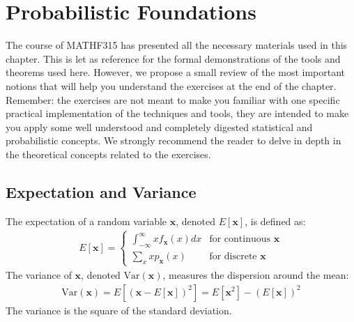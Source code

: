 \documentclass[letterpaper,10pt,english]{jupyterBook}
\begin{document}
\section{Probabilistic Foundations}
\label{\detokenize{01:probabilistic-foundations}}
\sphinxAtStartPar
The course of MATH\sphinxhyphen{}F315 \sphinxhyphen{}  has presented all the necessary materials used in this chapter. This is let as reference for the formal demonstrations of the tools and theorems used here. However, we propose a small review of the most important notions that will help you understand the exercises at the end of the chapter. Remember: the exercises are not meant to make you familiar with one specific practical implementation of the techniques and tools, they are intended to make you apply some well understood and completely digested statistical and probabilistic concepts. We strongly recommend the reader to delve in depth in the theoretical concepts related to the exercises.


\subsection{Expectation and Variance}
\label{\detokenize{01:expectation-and-variance}}
\sphinxAtStartPar
The expectation of a random variable \(\mathbf x\), denoted \(E[\mathbf x]\), is defined as:
\begin{equation*}
\begin{split}
E[\mathbf x] = \begin{cases}
    \int_{-\infty}^{\infty} x f_{\mathbf x}(x) dx & \text{for continuous $\mathbf x$} \\
    \sum_{x} x p_{\mathbf x}(x) & \text{for discrete $\mathbf x$}
\end{cases}
\end{split}
\end{equation*}
\sphinxAtStartPar
The variance of \(\mathbf x\), denoted \(\text{Var}(\mathbf x)\), measures the dispersion around the mean:
\begin{equation*}
\begin{split}
\text{Var}(\mathbf x) = E[(\mathbf x - E[\mathbf x])^2] = E[\mathbf x^2] - (E[\mathbf x])^2
\end{split}
\end{equation*}
\sphinxAtStartPar
The variance is the square of the standard deviation.
\end{document}
